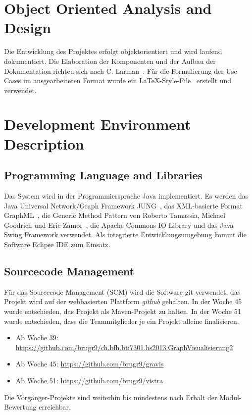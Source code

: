 \section{Object Oriented Analysis and Design}
\label{sec:Object Oriented Analysis and Design}
Die Entwicklung des Projektes erfolgt objektorientiert und wird laufend dokumentiert. Die Elaboration der Komponenten und der Aufbau der Dokumentation richten sich nach C. Larman~\cite{larmann:2004}. F\"ur die Formulierung der Use Cases im ausgearbeiteten Format wurde ein \LaTeX-Style-File~\cite{bruggmann:2013} erstellt und verwendet.
% 
\section{Development Environment Description}
\label{sec:Development Environment Description}
% 
\subsection{Programming Language and Libraries}
\label{subsec:Programming Language and Libraries}
Das System wird in der Programmiersprache Java implementiert. Es werden das Java Universal Network/Graph Framework JUNG~\cite{jung:2013}, das XML-basierte Format GraphML~\cite{graphml:2013}, die Generic Method Pattern von Roberto Tamassia, Michael Goodrich und Eric Zamor~\cite{tamassiagoodrichzamor:2013}, die Apache Commons IO Library und das Java Swing Framework verwendet. Als integrierte Entwicklungsumgebung kommt die Software Eclipse IDE zum Einsatz.
% 
\subsection{Sourcecode Management}
\label{subsec:Sourcecode Management}
F\"ur das Sourcecode Management (SCM) wird die Software git verwendet, das Projekt wird auf der webbasierten Plattform \textit{github} gehalten. In der Woche 45 wurde entschieden, das Projekt als Maven-Projekt zu halten. In der Woche 51 wurde entschieden, dass die Teammitglieder je ein Projekt alleine finalisieren.

\begin{itemize}
  \item Ab Woche 39: \url{https://github.com/brugr9/ch.bfh.bti7301.hs2013.GraphVisualisierung2}
  \item Ab Woche 45: \url{https://github.com/brugr9/gravis}
  \item Ab Woche 51: \url{https://github.com/brugr9/vistra}
\end{itemize}

Die Vorg\"anger-Projekte sind weiterhin bis mindestens nach Erhalt der Modul-Bewertung erreichbar.